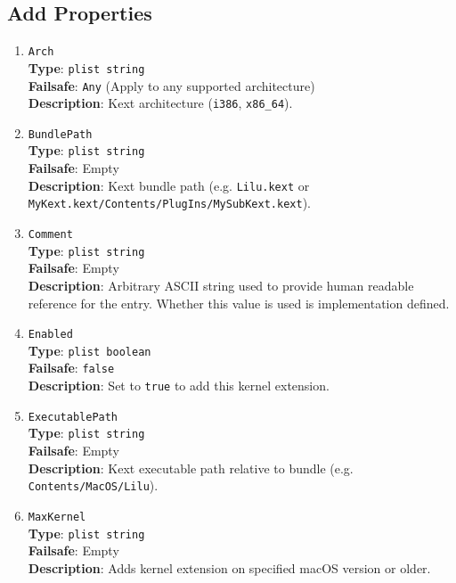 \documentclass[]{article}
\makeatletter
\renewcommand{\label}[1]{%
\zref@wrapper@immediate{\oldlabel{#1}}}  %
\makeatother
\begin{document}
\subsection{Add Properties}\label{kernelpropsadd}

\begin{enumerate}
\item
  \texttt{Arch}\\
  \textbf{Type}: \texttt{plist\ string}\\
  \textbf{Failsafe}: \texttt{Any} (Apply to any supported architecture)\\
  \textbf{Description}: Kext architecture (\texttt{i386}, \texttt{x86\_64}).

\item
  \texttt{BundlePath}\\
  \textbf{Type}: \texttt{plist\ string}\\
  \textbf{Failsafe}: Empty\\
  \textbf{Description}: Kext bundle path (e.g. \texttt{Lilu.kext}
  or \texttt{MyKext.kext/Contents/PlugIns/MySubKext.kext}).

\item
  \texttt{Comment}\\
  \textbf{Type}: \texttt{plist\ string}\\
  \textbf{Failsafe}: Empty\\
  \textbf{Description}: Arbitrary ASCII string used to provide human readable
  reference for the entry. Whether this value is used is implementation defined.

\item
  \texttt{Enabled}\\
  \textbf{Type}: \texttt{plist\ boolean}\\
  \textbf{Failsafe}: \texttt{false}\\
  \textbf{Description}: Set to \texttt{true} to add this kernel extension.

\item
  \texttt{ExecutablePath}\\
  \textbf{Type}: \texttt{plist\ string}\\
  \textbf{Failsafe}: Empty\\
  \textbf{Description}: Kext executable path relative to bundle
  (e.g. \texttt{Contents/MacOS/Lilu}).

\item
  \texttt{MaxKernel}\\
  \textbf{Type}: \texttt{plist\ string}\\
  \textbf{Failsafe}: Empty\\
  \textbf{Description}: Adds kernel extension on specified macOS version or older.


\end{enumerate}
\end{document}
